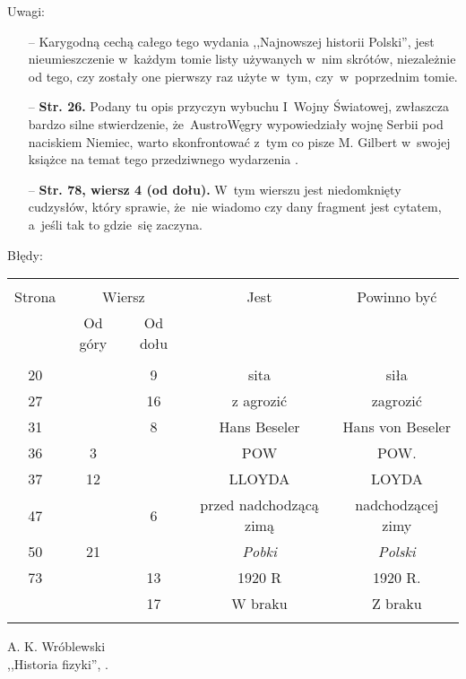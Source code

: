 \documentclass[a4paper,11pt]{article}
\newcommand{\Str}[1]{\textbf{Str. #1.}}
\newcommand{\StrWd}[2]{\textbf{Str. #1, wiersz #2 (od dołu).}}
\begin{document}
Uwagi:
\begin{itemize}
\item[--] Karygodną cechą całego tego wydania ,,Najnowszej historii
  Polski'', jest nieumieszczenie w~każdym tomie listy używanych w~nim
  skrótów, niezależnie od tego, czy zostały one pierwszy raz użyte
  w~tym, czy~w~poprzednim tomie.
\item[--] \Str{26} Podany tu opis przyczyn wybuchu I~Wojny Światowej,
  zwłaszcza bardzo silne stwierdzenie, że~Austro\dywiz Węgry
  wypowiedziały wojnę Serbii pod naciskiem Niemiec, warto
  skonfrontować z~tym co pisze M. Gilbert w~swojej książce na temat
  tego przedziwnego wydarzenia \cite{Gil03}.
\item[--] \StrWd{78}{4} W~tym wierszu jest niedomknięty cudzysłów,
  który sprawie, że~nie wiadomo czy dany fragment jest cytatem,
  a~jeśli tak to gdzie~się zaczyna.
\end{itemize}

Błędy:\\
\begin{center}
  \begin{tabular}{|c|c|c|c|c|}
    \hline
    & \multicolumn{2}{c|}{} & & \\
    Strona & \multicolumn{2}{c|}{Wiersz}& Jest & Powinno być \\ \cline{2-3}
    & Od góry & Od dołu &  &  \\ \hline
    & & & & \\
    20 & & 9 & sita & siła \\
    27 & & 16 & z agrozić & zagrozić \\
    31 & & 8 & Hans Beseler & Hans von Beseler \\
    36 & 3 & & POW & POW. \\
    37 & 12 & & LLOYDA & LOYDA \\
    47 & & 6 & przed nadchodzącą zimą & nadchodzącej zimy \\
    50 & 21 & & \emph{Pobki} & \emph{Polski} \\
    73 & & 13 & 1920 R & 1920 R. \\
    & & 17 & W braku & Z braku \\
    & & & & \\ \hline
  \end{tabular}
\end{center}

\begin{center}
  A. K. Wróblewski \\
  ,,Historia fizyki'', \cite{Wro06}.
\end{center}
\end{document}
